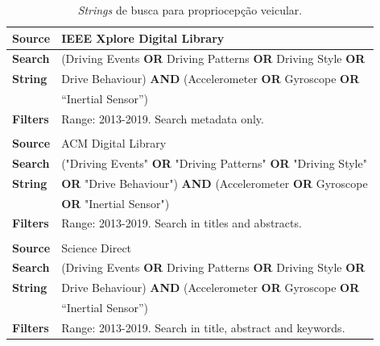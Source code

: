 \begin{table}[h!]
    \caption{\textit{Strings} de busca para propriocepção veicular.}
    \label{tabela:propriocepcao_busca}
    \centering
    \begin{tabular}{l l}
        
        \toprule
        \textbf{Source} & IEEE Xplore Digital Library \\
        \toprule
        \textbf{Search} & (Driving Events \textbf{OR} Driving Patterns \textbf{OR} Driving Style \textbf{OR} \\ \textbf{String} & Drive Behaviour) \textbf{AND} (Accelerometer \textbf{OR} Gyroscope \textbf{OR} \\ & “Inertial Sensor”) \\
        \toprule
        \textbf{Filters} & Range: 2013-2019. Search metadata only. \\
        \bottomrule
        
        \\
        
        \toprule
        \textbf{Source} & ACM Digital Library \\
        \toprule
        \textbf{Search} & ("Driving Events" \textbf{OR} "Driving Patterns" \textbf{OR} "Driving Style" \\ \textbf{String} & \textbf{OR} "Drive Behaviour")  \textbf{AND} (Accelerometer \textbf{OR} Gyroscope \\ & \textbf{OR} "Inertial Sensor") \\
        \toprule
        \textbf{Filters} & Range: 2013-2019. Search in titles and abstracts. \\
        \bottomrule
         
         \\
         
        \toprule
        \textbf{Source} & Science Direct \\
        \toprule
        \textbf{Search} & (Driving Events \textbf{OR} Driving Patterns \textbf{OR} Driving Style \textbf{OR} \\ \textbf{String} & Drive Behaviour) \textbf{AND} (Accelerometer \textbf{OR} Gyroscope \textbf{OR} \\ & “Inertial Sensor”) \\
        \toprule
        \textbf{Filters} & Range: 2013-2019. Search in title, abstract and keywords. \\
        \bottomrule
        
    \end{tabular}
\end{table}

